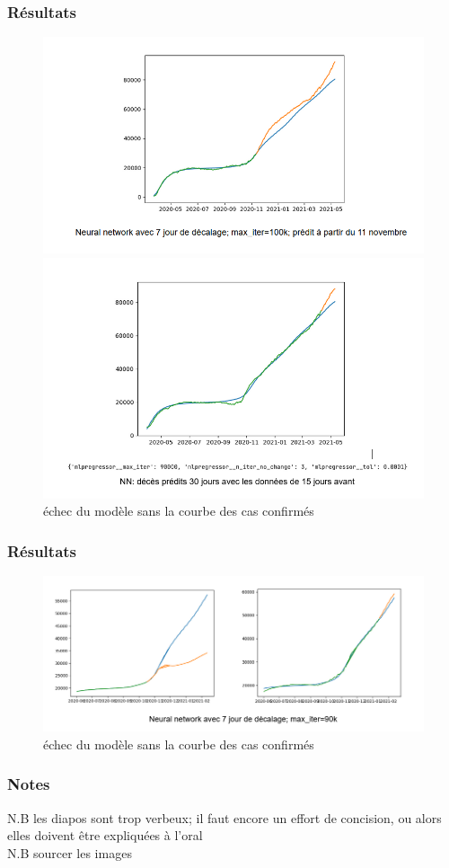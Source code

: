 \documentclass{beamer}
\begin{document}
\begin{frame}
	\frametitle{Résultats}
	\begin{figure}[h]
		\centering
		\begin{minipage}{0.5\textwidth}
			\includegraphics[width=\textwidth]{NN_1}
			\centering
		\end{minipage}
		\begin{minipage}{0.5\textwidth}
			\includegraphics[width=\textwidth]{NN_2}
			\centering
		\end{minipage}
	\caption{échec du modèle sans la courbe des cas confirmés}
	\end{figure}
\end{frame}

\begin{frame}
	\frametitle{Résultats}
	\begin{figure}
		\includegraphics[scale=0.6]{NN_3}
		\caption{échec du modèle sans la courbe des cas confirmés}
	\end{figure}
\end{frame}

\begin{frame}
	\frametitle{Notes}
	\alert{N.B les diapos sont trop verbeux; il faut encore un effort de concision, ou alors elles doivent être expliquées à l'oral}\\
	\alert{N.B sourcer les images}
\end{frame}
\end{document}
